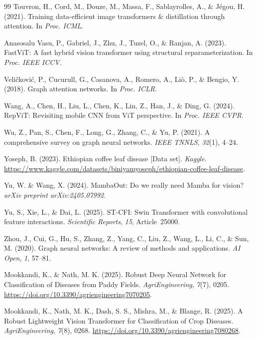 \documentclass[]{interact}
\theoremstyle{plain}
\theoremstyle{definition}
\theoremstyle{remark}
\begin{document}
\begin{thebibliography}{99}
Touvron, H., Cord, M., Douze, M., Massa, F., Sablayrolles, A., \& J\'{e}gou, H. (2021). Training data-efficient image transformers \& distillation through attention. In \emph{Proc. ICML}.

Anasosalu Vasu, P., Gabriel, J., Zhu, J., Tuzel, O., \& Ranjan, A. (2023). FastViT: A fast hybrid vision transformer using structural reparameterization. In \emph{Proc. IEEE ICCV}.

Veli\v{c}kovi\'{c}, P., Cucurull, G., Casanova, A., Romero, A., Li\`{o}, P., \& Bengio, Y. (2018). Graph attention networks. In \emph{Proc. ICLR}.

Wang, A., Chen, H., Liu, L., Chen, K., Lin, Z., Han, J., \& Ding, G. (2024). RepViT: Revisiting mobile CNN from ViT perspective. In \emph{Proc. IEEE CVPR}.

Wu, Z., Pan, S., Chen, F., Long, G., Zhang, C., \& Yu, P. (2021). A comprehensive survey on graph neural networks. \emph{IEEE TNNLS}, \emph{32}(1), 4--24.

Yoseph, B. (2023). Ethiopian coffee leaf disease [Data set]. \emph{Kaggle}. \url{https://www.kaggle.com/datasets/biniyamyoseph/ethiopian-coffee-leaf-disease}.

Yu, W. \& Wang, X. (2024). MambaOut: Do we really need Mamba for vision? \emph{arXiv preprint arXiv:2405.07992}.

Yu, S., Xie, L., \& Dai, L. (2025). ST-CFI: Swin Transformer with convolutional feature interactions. \emph{Scientific Reports}, \emph{15}, Article~25000.

Zhou, J., Cui, G., Hu, S., Zhang, Z., Yang, C., Liu, Z., Wang, L., Li, C., \& Sun, M. (2020). Graph neural networks: A review of methods and applications. \emph{AI Open}, \emph{1}, 57--81.

Mookkandi, K., \& Nath, M. K. (2025). Robust Deep Neural Network for Classification of Diseases from Paddy Fields. \emph{AgriEngineering}, \emph{7}(7), 0205. \url{https://doi.org/10.3390/agriengineering7070205}.

Mookkandi, K., Nath, M. K., Dash, S. S., Mishra, M., \& Blange, R. (2025). A Robust Lightweight Vision Transformer for Classification of Crop Diseases. \emph{AgriEngineering}, \emph{7}(8), 0268. \url{https://doi.org/10.3390/agriengineering7080268}.


\end{thebibliography}
\end{document}
